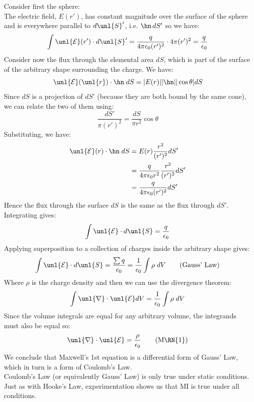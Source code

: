 \documentclass[a4paper, 11pt, normalem]{report}
\renewcommand\E{\mathcal{E}}
\newcommand\uE{\unl{\E}}
\renewcommand\del{\unl{\nabla}}
\newcommand\eno{\epsilon_0}
\begin{document}
Consider first the sphere: \\
The electric field, $E(r')$, has constant magnitude over the surface of the sphere and is everywhere parallel to $d\unl{S}'$, i.e. $\hn\,dS'$ so we have:
\begin{equation}
    \int \uE(r') \cdot d\unl{S}' = \frac{q}{4\pi\eno(r')^2}\cdot 4\pi(r')^2 = \frac{q}{\eno}
\end{equation}
Consider now the flux through the elemental area $dS$, which is part of the surface of the arbitrary shape surrounding the charge.
We have:
\begin{equation}
    \uE(\unl{r})\cdot \hn\;dS = |E(r)||\hn||\cos\theta|dS
\end{equation}
Since $dS$ is a projection of $dS'$ (because they are both bound by the same cone), we can relate the two of them using:
\begin{equation}
    \frac{dS'}{\pi(r')^2} = \frac{dS}{\pi r^2}\cos\theta
\end{equation}
Substituting, we have:
\begin{align}
    \uE(r)\cdot\hn\;dS &= E(r)\frac{r^2}{(r')^2}dS' \\
    &= \frac{q}{4\pi\eno r^2}\frac{r^2}{(r')^2} dS' \\
    &= \frac{q}{4\pi\eno(r')^2}dS'
\end{align}
Hence the flux through the surface $dS$ is the same as the flux through $dS'$. \\
Integrating gives:
\begin{equation}
    \int \uE\cdot d\unl{S} = \frac{q}{\eno}
\end{equation}
Applying superposition to a collection of charges inside the arbitrary shape gives:
\begin{equation}
    \int \uE\cdot d\unl{S} = \frac{\sum q}{\eno} = \frac{1}{\eno}\int \rho\;dV \tag{Gauss' Law}
\end{equation}
Where $\rho$ is the charge density and then we can use the divergence theorem:
\begin{equation}
    \int \del \cdot \uE dV = \frac{1}{\eno} \int \rho\;dV
\end{equation}
Since the volume integrals are equal for any arbitrary volume, the integrands must also be equal so:
\begin{equation}
    \del \cdot \uE = \frac{\rho}{\eno} \tag{M\RN{1}}
\end{equation}
We conclude that Maxwell's 1st equation is a differential form of Gauss' Law, which in turn is a form of Coulomb's Law. \\
Coulomb's Law (or equivalently Gauss' Law) is only true under static conditions.
Just as with Hooke's Law, experimentation shows us that M\RN{1} is true under all conditions.
\end{document}
